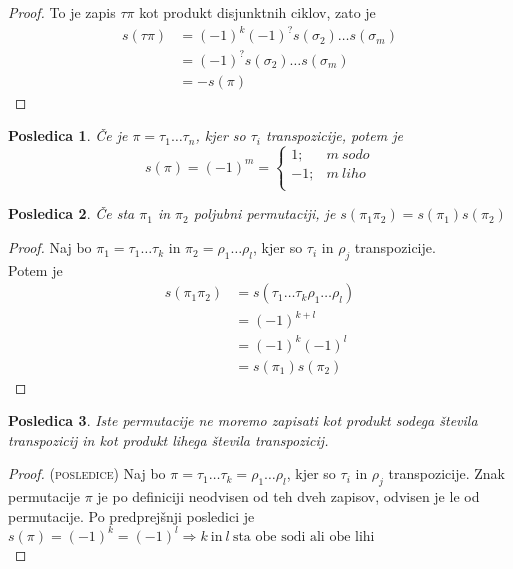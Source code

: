 \documentclass[a4paper,12pt]{article}
\newtheorem*{posl}{Posledica}
\begin{document}
\begin{proof}
To je zapis $\tau  \pi$ kot produkt disjunktnih ciklov, zato je 
\begin{align*}
s(\tau \pi) & =(-1)^k(-1)^{?}s(\sigma_2)\ldots s(\sigma_m)\\
& =(-1)^{?} s(\sigma_2)\ldots s(\sigma_m)\\
& =-s(\pi)
\end{align*}

\end{proof}

\begin{posl}
Če je $\pi=\tau_1 \ldots \tau_n$, kjer so $\tau_i$ transpozicije, potem je 
$$ s(\pi)=(-1)^m = 
\begin{cases}
1; & m~sodo \\
-1; & m~liho \\
\end{cases} 
$$
\end{posl}

\begin{posl}
Če sta $\pi_1$ in $\pi_2$ poljubni permutaciji, je $s(\pi_1\pi_2)=s(\pi_1)s(\pi_2)$\\
\end{posl}

\begin{proof}
Naj bo $\pi_1=\tau_1\ldots \tau_k$ in $\pi_2=\rho_1\ldots \rho_l$, kjer so $\tau_i$ in $\rho_j$ transpozicije. \\

Potem je 
\begin{align*}
s(\pi_1\pi_2)&= s(\tau_1\ldots\tau_k \rho_1 \ldots \rho_l)  \\
& = (-1)^{k+l}  \\
& = (-1)^k(-1)^l  \\
& = s(\pi_1)s(\pi_2)
\end{align*}

\end{proof}

\begin{posl}
Iste permutacije ne moremo zapisati kot produkt sodega števila transpozicij in kot produkt lihega števila transpozicij.\\
\end{posl}

\begin{proof} (\textsc{posledice})
Naj bo $\pi=\tau_1\ldots \tau_k=\rho_1\ldots \rho_l$, kjer so $\tau_i$ in $\rho_j$ transpozicije. Znak permutacije $\pi$ je po definiciji neodvisen od teh dveh zapisov, odvisen je le od permutacije. Po predprejšnji posledici je  $s(\pi)=(-1)^k=(-1)^l\Rightarrow k~ \text{in}~l~\text{sta obe sodi ali obe lihi}$\\
\end{proof}
\end{document}
